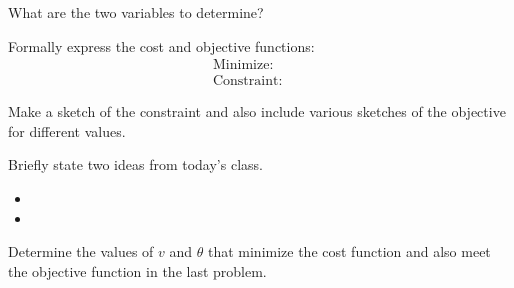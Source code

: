 \begin{problem}
\begin{subproblem}
    \clearpage

  \item What are the two variables to determine?
    \vspace{2em}

  \item Formally express the cost and objective functions:
    \begin{eqnarray*}
      \mathrm{Minimize:} & &  \\
      \mathrm{Constraint:} & & 
    \end{eqnarray*}


  \item Make a sketch of the constraint and also include various
    sketches of the objective for different values.

    \vfill

  \item 

  \end{subproblem}

\end{problem}

\postClass

\begin{problem}
\item Briefly state two ideas from today's class.
  \begin{itemize}
  \item 
  \item 
  \end{itemize}
\item Determine the values of $v$ and $\theta$ that minimize the cost
  function and also meet the objective function in the last problem.
  \vfill
\end{problem}




\begin{problem}
\item
\end{problem}


